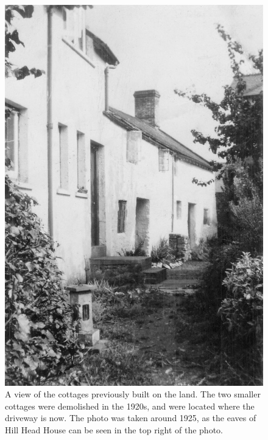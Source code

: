 \begin{figure}
     \includegraphics[width=1\textwidth]{figures/Cottages}
     \caption{A view of the cottages previously built on the land. The two smaller cottages were demolished in the 1920s, and were located where the driveway is now. The photo was taken around 1925, as the eaves of Hill Head House can be seen in the top right of the photo.}
     \label{fig:Cottages}
\end{figure}

\afterpage{\clearpage}

